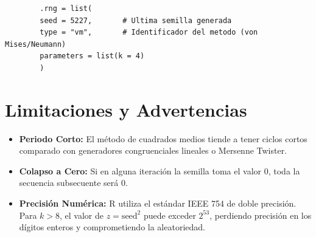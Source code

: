\documentclass[a4paper,11pt]{article}
\begin{document}
	\begin{lstlisting}
		.rng = list(
		seed = 5227,       # Ultima semilla generada
		type = "vm",       # Identificador del metodo (von Mises/Neumann)
		parameters = list(k = 4)
		)
	\end{lstlisting}
	
	\section{Limitaciones y Advertencias}
	\begin{itemize}
		\item \textbf{Periodo Corto:} El método de cuadrados medios tiende a tener ciclos cortos comparado con generadores congruenciales lineales o Mersenne Twister.
		\item \textbf{Colapso a Cero:} Si en alguna iteración la semilla toma el valor $0$, toda la secuencia subsecuente será $0$.
		\item \textbf{Precisión Numérica:} R utiliza el estándar IEEE 754 de doble precisión. Para $k > 8$, el valor de $z = \text{seed}^2$ puede exceder $2^{53}$, perdiendo precisión en los dígitos enteros y comprometiendo la aleatoriedad.
	\end{itemize}
	
\end{document}
